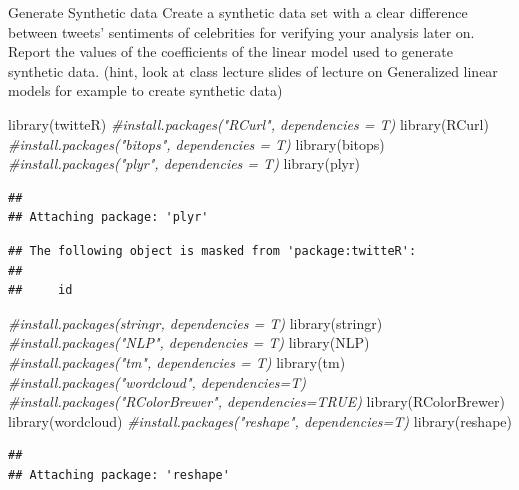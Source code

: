 \documentclass[
  ignorenonframetext,
]{beamer}
\newenvironment{Shaded}{\begin{snugshade}}{\end{snugshade}}
\newcommand{\CommentTok}[1]{\textcolor[rgb]{0.56,0.35,0.01}{\textit{#1}}}
\newcommand{\FunctionTok}[1]{\textcolor[rgb]{0.00,0.00,0.00}{#1}}
\newcommand{\NormalTok}[1]{#1}
\begin{document}
\begin{frame}[fragile]{Generate Synthetic data}
\protect\hypertarget{generate-synthetic-data}{}
Create a synthetic data set with a clear difference between tweets'
sentiments of celebrities for verifying your analysis later on. Report
the values of the coefficients of the linear model used to generate
synthetic data. (hint, look at class lecture slides of lecture on
Generalized linear models for example to create synthetic data)

\begin{Shaded}
\begin{Highlighting}[]
\FunctionTok{library}\NormalTok{(twitteR)}
\CommentTok{\#install.packages("RCurl", dependencies = T)}
\FunctionTok{library}\NormalTok{(RCurl)}
\CommentTok{\#install.packages("bitops", dependencies = T)}
\FunctionTok{library}\NormalTok{(bitops)}
\CommentTok{\#install.packages("plyr", dependencies = T)}
\FunctionTok{library}\NormalTok{(plyr)}
\end{Highlighting}
\end{Shaded}

\begin{verbatim}
## 
## Attaching package: 'plyr'
\end{verbatim}

\begin{verbatim}
## The following object is masked from 'package:twitteR':
## 
##     id
\end{verbatim}

\begin{Shaded}
\begin{Highlighting}[]
\CommentTok{\#install.packages(\textquotesingle{}stringr\textquotesingle{}, dependencies = T)}
\FunctionTok{library}\NormalTok{(stringr)}
\CommentTok{\#install.packages("NLP", dependencies = T)}
\FunctionTok{library}\NormalTok{(NLP)}
\CommentTok{\#install.packages("tm", dependencies = T)}
\FunctionTok{library}\NormalTok{(tm)}
\CommentTok{\#install.packages("wordcloud", dependencies=T)}
\CommentTok{\#install.packages("RColorBrewer", dependencies=TRUE)}
\FunctionTok{library}\NormalTok{(RColorBrewer)}
\FunctionTok{library}\NormalTok{(wordcloud)}
\CommentTok{\#install.packages("reshape", dependencies=T)}
\FunctionTok{library}\NormalTok{(reshape)}
\end{Highlighting}
\end{Shaded}

\begin{verbatim}
## 
## Attaching package: 'reshape'
\end{verbatim}


\end{frame}
\end{document}

